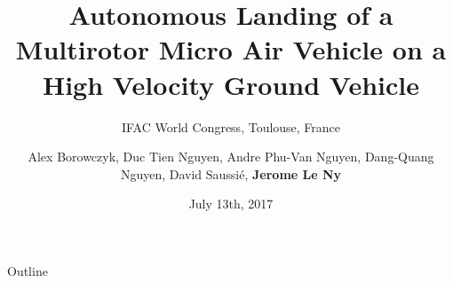 \documentclass{beamer}
\title{Autonomous Landing of a Multirotor Micro Air Vehicle on a High Velocity Ground Vehicle}
\subtitle{IFAC World Congress, Toulouse, France}
\date{July 13th, 2017}
\author{Alex Borowczyk, Duc Tien Nguyen, Andre Phu-Van Nguyen, Dang-Quang Nguyen, David Saussi\'e, \textbf{Jerome Le Ny}}
\begin{document}
  \maketitle
  




\begin{frame}{Outline}
  \tableofcontents
\end{frame}






   
  
\end{document}
